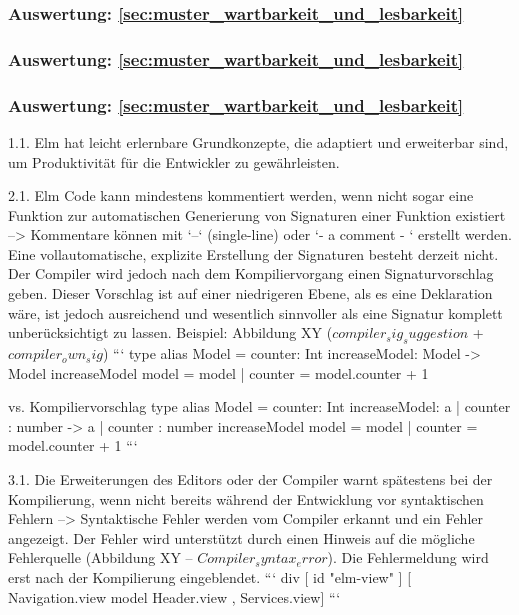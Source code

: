 \subsubsection{Auswertung: \ref{sec:muster_wartbarkeit_und_lesbarkeit} }


\subsubsection{Auswertung: \ref{sec:muster_wartbarkeit_und_lesbarkeit} }


\subsubsection{Auswertung: \ref{sec:muster_wartbarkeit_und_lesbarkeit} }



 1.1. Elm hat leicht erlernbare Grundkonzepte, die adaptiert und erweiterbar sind, um Produktivität für die Entwickler zu gewährleisten.
 
 2.1. Elm Code kann mindestens kommentiert werden, wenn nicht sogar eine Funktion zur automatischen Generierung von Signaturen einer Funktion existiert
 --> Kommentare können mit `--` (single-line) oder `{- a comment - }` erstellt werden. Eine vollautomatische, explizite Erstellung der Signaturen besteht derzeit nicht. Der Compiler wird jedoch nach dem Kompiliervorgang einen Signaturvorschlag geben. Dieser Vorschlag ist auf einer niedrigeren Ebene, als es eine Deklaration wäre, ist jedoch ausreichend und wesentlich sinnvoller als eine Signatur komplett unberücksichtigt zu lassen. Beispiel: Abbildung XY ($compiler_sig_suggestion$ + $compiler_own_sig$)
 ```
 type alias Model = { counter: Int }
 increaseModel: Model -> Model
 increaseModel model =
     {model | counter = model.counter + 1}
 
 vs. Kompiliervorschlag
 type alias Model = { counter: Int }
 increaseModel: { a | counter : number } -> { a | counter : number }
 increaseModel model =
     {model | counter = model.counter + 1}
 ```
 
 3.1. Die Erweiterungen des Editors oder der Compiler warnt spätestens bei der Kompilierung, wenn nicht bereits während der Entwicklung vor syntaktischen Fehlern
 --> Syntaktische Fehler werden vom Compiler erkannt und ein Fehler angezeigt. Der Fehler wird unterstützt durch einen Hinweis auf die mögliche Fehlerquelle (Abbildung XY – $Compiler_syntax_error$). Die Fehlermeldung wird erst nach der Kompilierung eingeblendet.
 ```
 div [ id "elm-view" ]
         [ Navigation.view model
             Header.view
         , Services.view]
 ```
 
